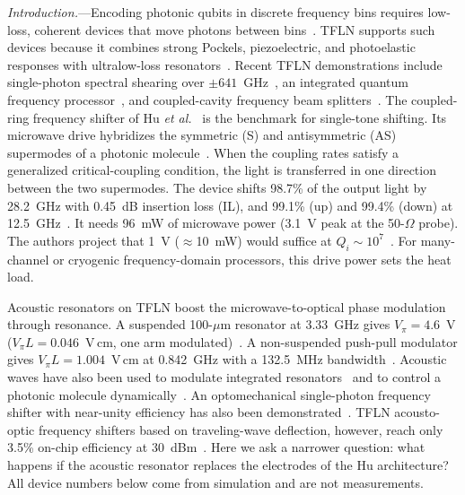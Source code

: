 \documentclass[aps,prl,reprint,superscriptaddress,amsmath,amssymb,floatfix]{revtex4-2}
\begin{document}
\emph{Introduction.}---Encoding photonic qubits in discrete frequency bins requires low-loss, coherent devices that move photons between bins~\cite{Lukens2017,Kues2017,Lu2018}. TFLN supports such devices because it combines strong Pockels, piezoelectric, and photoelastic responses with ultralow-loss resonators~\cite{Wang2018,Zhang2017,Zhu2026loss}. Recent TFLN demonstrations include single-photon spectral shearing over $\pm641$~GHz~\cite{Zhu2022}, an integrated quantum frequency processor~\cite{Yang2026}, and coupled-cavity frequency beam splitters~\cite{Cohen2026}. The coupled-ring frequency shifter of Hu \emph{et al.}~\cite{Hu2021} is the benchmark for single-tone shifting. Its microwave drive hybridizes the symmetric (S) and antisymmetric (AS) supermodes of a photonic molecule~\cite{Zhang2019}. When the coupling rates satisfy a generalized critical-coupling condition, the light is transferred in one direction between the two supermodes. The device shifts 98.7\% of the output light by 28.2~GHz with 0.45~dB insertion loss (IL), and 99.1\% (up) and 99.4\% (down) at 12.5~GHz~\cite{Hu2021}. It needs 96~mW of microwave power (3.1~V peak at the 50-$\Omega$ probe). The authors project that 1~V ($\approx$10~mW) would suffice at $Q_i\sim10^7$~\cite{Hu2021}. For many-channel or cryogenic frequency-domain processors, this drive power sets the heat load.

Acoustic resonators on TFLN boost the microwave-to-optical phase modulation through resonance. A suspended 100-$\mu$m resonator at 3.33~GHz gives $V_\pi=4.6$~V ($V_\pi L=0.046$~V\,cm, one arm modulated)~\cite{Shao2019}. A non-suspended push-pull modulator gives $V_\pi L=1.004$~V\,cm at 0.842~GHz with a 132.5~MHz bandwidth~\cite{Ni2026}. Acoustic waves have also been used to modulate integrated resonators~\cite{Tadesse2014} and to control a photonic molecule dynamically~\cite{Kapfinger2015}. An optomechanical single-photon frequency shifter with near-unity efficiency has also been demonstrated~\cite{Fan2016}. %
TFLN acousto-optic frequency shifters based on traveling-wave deflection, however, reach only 3.5\% on-chip efficiency at 30~dBm~\cite{Shao2020}. Here we ask a narrower question: what happens if the acoustic resonator replaces the electrodes of the Hu architecture? All device numbers below come from simulation and are not measurements.
\end{document}
